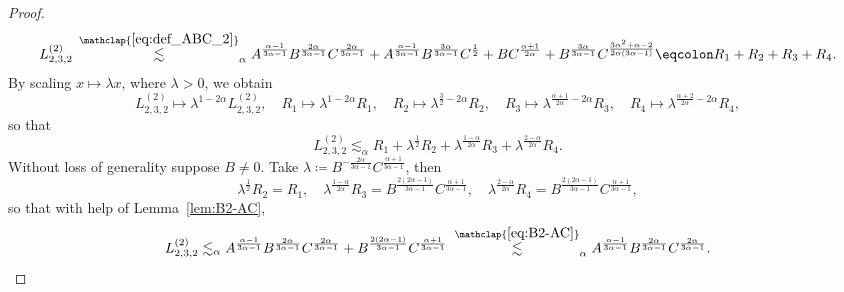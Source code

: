 \documentclass[reqno,12pt]{amsart}
\numberwithin{equation}{section}
\begin{document}
\begin{proof}
\begin{align*}
L_{2,3,2}^{(2)}
\, \stackrel{\mathclap{\eqref{eq:def_ABC_2}}}{\lesssim}_{\alpha} A^\frac{\alpha-1}{3\alpha-1} B^\frac{2\alpha}{3\alpha-1} C^\frac{2\alpha}{3\alpha-1} + A^\frac{\alpha-1}{3\alpha-1} B^\frac{3\alpha}{3\alpha-1} 
    C^\frac{1}{2} + B C^\frac{\alpha+1}{2\alpha} + B^\frac{3\alpha}{3\alpha-1} C^\frac{3\alpha^2+\alpha -2}{2\alpha(3\alpha-1)} \eqcolon R_1 + R_2 + R_3 + R_4.
\end{align*}
By scaling $x \mapsto \lambda x$, where $\lambda > 0$, we obtain
%
\[
L^{(2)}_{2,3,2} \mapsto \lambda^{1-2\alpha} L^{(2)}_{2,3,2}, \quad R_1 \mapsto \lambda^{1-2\alpha} R_1, \quad R_2 \mapsto \lambda^{\frac 3 2 - 2 \alpha} R_2, \quad R_3 \mapsto \lambda^{\frac{\alpha+1}{2\alpha} - 2 \alpha} R_3, \quad R_4 \mapsto \lambda^{\frac{\alpha+2}{2\alpha} - 2\alpha} R_4,
\]
%
so that
%
\[
L^{(2)}_{2,3,2} \lesssim_\alpha R_1 + \lambda^{\frac 1 2} R_2 + \lambda^{\frac{1-\alpha}{2\alpha}} R_3 + \lambda^{\frac{2-\alpha}{2\alpha}} R_4.
\]
%
Without loss of generality suppose $B \ne 0$. Take $\lambda \coloneq B^{-\frac{2\alpha}{3\alpha-1}} C^{\frac{\alpha+1}{3\alpha-1}}$, then
%
\[
\lambda^{\frac 1 2} R_2 = R_1, \quad \lambda^{\frac{1-\alpha}{2\alpha}} R_3 = B^{\frac{2(2\alpha-1)}{3\alpha-1}} C^{\frac{\alpha+1}{3\alpha-1}}, \quad \lambda^{\frac{2-\alpha}{2\alpha}} R_4 = B^{\frac{2(2\alpha-1)}{3\alpha-1}} C^\frac{\alpha+1}{3\alpha-1},
\]
%
so that with help of Lemma~\ref{lem:B2-AC},
%
\begin{equation}\label{eq:estimate_K_2}
L^{(2)}_{2,3,2} \lesssim_\alpha A^\frac{\alpha-1}{3\alpha-1} B^\frac{2\alpha}{3\alpha-1} C^\frac{2\alpha}{3\alpha-1} + B^{\frac{2(2\alpha-1)}{3\alpha-1}} C^\frac{\alpha+1}{3\alpha-1} \; \stackrel{\mathclap{\eqref{eq:B2-AC}}}{\lesssim}_\alpha A^\frac{\alpha-1}{3\alpha-1} B^\frac{2\alpha}{3\alpha-1} C^\frac{2\alpha}{3\alpha-1}.
\end{equation}
%

\medskip


\end{proof}
\end{document}
